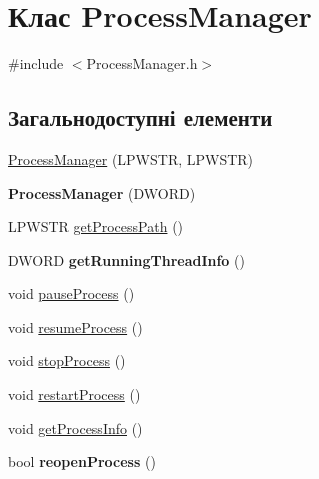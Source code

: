 \hypertarget{class_process_manager}{\section{Клас Process\+Manager}
\label{class_process_manager}
}


{\ttfamily \#include $<$Process\+Manager.\+h$>$}

\subsection*{Загальнодоступні елементи}
\begin{DoxyCompactItemize}
\item 
\hyperlink{class_process_manager_aeb235e3509127e76fbc1f9c525603120}{Process\+Manager} (L\+P\+W\+S\+T\+R, L\+P\+W\+S\+T\+R)
\item 
\hypertarget{class_process_manager_a37ddbc730a38922c9b7a0dafb0b7ab55}{{\bfseries Process\+Manager} (D\+W\+O\+R\+D)}\label{class_process_manager_a37ddbc730a38922c9b7a0dafb0b7ab55}

\item 
L\+P\+W\+S\+T\+R \hyperlink{class_process_manager_a8c5aa33cb2a82c784ff2fcef6d44b9c0}{get\+Process\+Path} ()
\item 
\hypertarget{class_process_manager_a0ad5c900976a56f7b2ebc0c12f52cbaf}{D\+W\+O\+R\+D {\bfseries get\+Running\+Thread\+Info} ()}\label{class_process_manager_a0ad5c900976a56f7b2ebc0c12f52cbaf}

\item 
void \hyperlink{class_process_manager_ab76d213c40e638d7f9010514c55b297c}{pause\+Process} ()
\item 
void \hyperlink{class_process_manager_a619fc4c91ff976a32ddd2ac4df145cd1}{resume\+Process} ()
\item 
void \hyperlink{class_process_manager_a3b451bc1c673b5439c9aae679a6d98f9}{stop\+Process} ()
\item 
void \hyperlink{class_process_manager_a1d2886645115a6ead83e19caf0e5ea1f}{restart\+Process} ()
\item 
void \hyperlink{class_process_manager_a44dcace533e34ae32b1b87f869027b69}{get\+Process\+Info} ()
\item 
\hypertarget{class_process_manager_a892aec6660bcb53b59bc643301339244}{bool {\bfseries reopen\+Process} ()}\label{class_process_manager_a892aec6660bcb53b59bc643301339244}


\end{DoxyCompactItemize}
